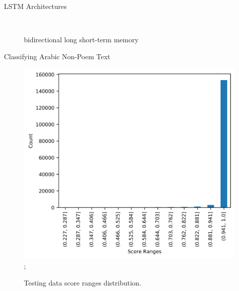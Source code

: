 \begin{frame}[fragile]{LSTM Architectures}
\begin{center}
\begin{figure}[!t]
\centering

\caption{bidirectional long short-term memory~\cite{Gitrepo_NN_Tikz}}~\label{Fig:BI-LSTM}
\end{figure}
\end{center}
\end{frame}
\begin{frame}[fragile]{Classifying Arabic Non-Poem Text}
\begin{figure}[!t]
	{\includegraphics[scale=.65]{./Figures/IMG_Result_Distribution.png}};
	\caption{Testing data score ranges distribution.}
\end{figure}

\end{frame}

